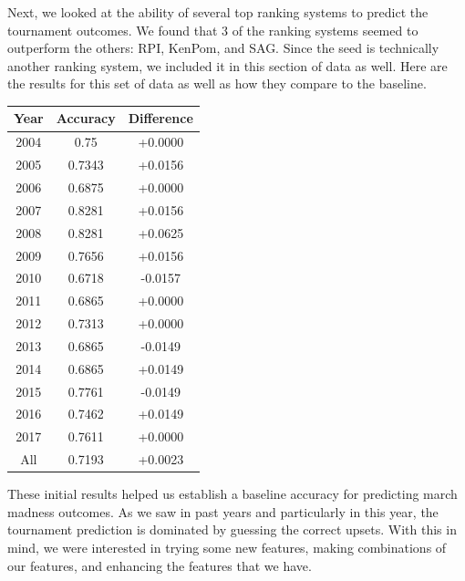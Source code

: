 Next, we looked at the ability of several top ranking systems to predict the tournament outcomes.
We found that 3 of the ranking systems seemed to outperform the others: RPI, KenPom, and SAG.
Since the seed is technically another ranking system, we included it in this section of data as well.
Here are the results for this set of data as well as how they compare to the baseline.

\vspace{0.5cm}
\begin{tabular}{c c c}
    \toprule
    Year & Accuracy & Difference\\
    \midrule
    2004 & 0.75 & +0.0000\\
    2005 & 0.7343 & +0.0156\\
    2006 & 0.6875 & +0.0000\\
    2007 & 0.8281 & +0.0156\\
    2008 & 0.8281 & +0.0625\\
    2009 & 0.7656 & +0.0156\\
    2010 & 0.6718 & -0.0157\\
    2011 & 0.6865 & +0.0000\\
    2012 & 0.7313 & +0.0000\\
    2013 & 0.6865 & -0.0149\\
    2014 & 0.6865 & +0.0149\\
    2015 & 0.7761 & -0.0149\\
    2016 & 0.7462 & +0.0149\\
    2017 & 0.7611 & +0.0000\\
    All & 0.7193 & +0.0023\\
    \bottomrule
\end{tabular}
\vspace{0.5cm}

These initial results helped us establish a baseline accuracy for predicting march madness outcomes.
As we saw in past years and particularly in this year, the tournament prediction is dominated by guessing the correct upsets.
With this in mind, we were interested in trying some new features, making combinations of our features, and enhancing the features that we have.